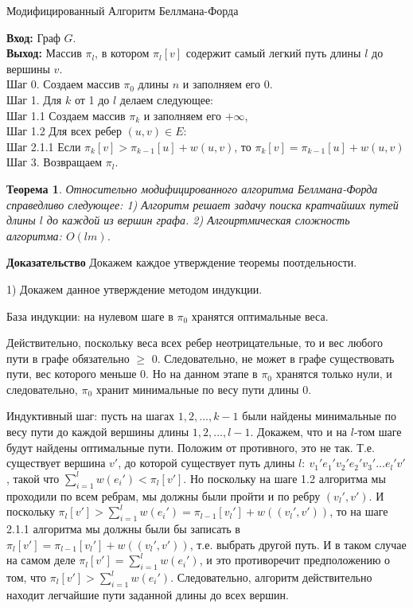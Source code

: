 \documentclass[a4paper,12pt]{report}
\theoremstyle{plain} %
\newtheorem{Theorem}{Теорема}[chapter]
\theoremstyle{definition}
\theoremstyle{remark}
\begin{document}
\begin{large}
\begin{algorithm}
\caption{Модифицированный Алгоритм Беллмана-Форда}
\label{diff_graph_construct}
\textbf{Вход:} Граф $G$.\\
\textbf{Выход:} Массив $\pi_l$, в котором $\pi_l[v]$ содержит самый легкий путь длины $l$ до вершины $v$.\\
Шаг 0. Создаем массив $\pi_0$ длины $n$ и заполняем его $0$. \\
Шаг 1. Для $k$ от 1 до $l$ делаем следующее:\\
Шаг 1.1 Создаем массив $\pi_k$ и заполняем его $+\infty$,\\
Шаг 1.2 Для всех ребер $(u, v) \in E:$\\
Шаг 2.1.1 Если $\pi_k[v] > \pi_{k-1}[u] + w(u,v)$, то $\pi_k[v] = \pi_{k-1}[u] + w(u,v)$\\
Шаг 3. Возвращаем $\pi_l$.\\
\end{algorithm}

\begin{Theorem}
Относительно модифицированного алгоритма Беллмана-Форда справедливо следующее:
1) Алгоритм решает задачу поиска кратчайших путей длины $l$ до каждой из вершин графа.
2) Алгоиртмическая сложность алгоритма: $O(lm)$.
\end{Theorem}
\textbf{Доказательство}
Докажем каждое утверждение теоремы поотдельности.

1) Докажем данное утверждение методом индукции.

База индукции: на нулевом шаге в $\pi_0$ хранятся оптимальные веса.

Действительно, поскольку веса всех ребер неотрицательные, то и вес любого пути в графе обязательно $\ge$ 0. Следовательно, не может в графе существовать пути, вес которого меньше 0. Но на данном этапе в $\pi_0$ хранятся только нули, и следовательно, $\pi_0$ хранит минимальные по весу пути длины 0.

Индуктивный шаг: пусть на шагах $1, 2, ..., k-1$ были найдены минимальные по весу пути до каждой вершины длины $1, 2, ..., l-1$. Докажем, что и на $l$-том шаге будут найдены оптимальные пути. Положим от противного, это не так. Т.е. существует вершина $v'$, до которой существует путь длины $l: ~ v_1'e_1'v_2'e_2'v_3'...e_l'v'$, такой что $\sum_{i=1}^l w(e_i') < \pi_l[v']$. Но поскольку на шаге 1.2 алгоритма мы проходили по всем ребрам, мы должны были пройти и по ребру $(v_l', v')$. И поскольку $\pi_l[v'] > \sum_{i=1}^l w(e_i') = \pi_{l-1}[v_{l}'] + w( (v_l', v'))$, то на шаге 2.1.1 алгоритма мы должны были бы записать в $\pi_l[v'] = \pi_{l-1}[v_{l}'] + w( (v_l', v'))$, т.е. выбрать другой путь. И в таком случае на самом деле $\pi_l[v'] =  \sum_{i=1}^l w(e_i') $, и это противоречит предположению о том, что $\pi_l[v'] > \sum_{i=1}^l w(e_i')$. Следовательно, алгоритм действительно находит легчайшие пути заданной длины до всех вершин.


\end{large}
\end{document}
